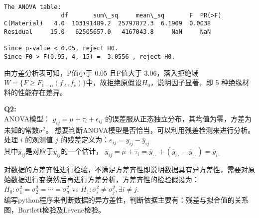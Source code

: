 \documentclass[11pt]{ctexart}
\begin{document}
    \begin{Verbatim}[commandchars=\\\{\}]
The ANOVA table:
                df       sum\_sq     mean\_sq       F  PR(>F)
C(Material)   4.0  103191489.2  25797872.3  6.1909  0.0038
Residual     15.0   62505657.0   4167043.8     NaN     NaN

Since p-value < 0.05, reject H0.
Since F0 > F(0.95, 4, 15) =  3.0556 , reject H0.
    \end{Verbatim}

    由方差分析表可知，P值小于 0.05 且F值大于
3.06，落入拒绝域\(W=\{F\ge F_{1-\alpha}(f_A,f_e)\}\)中，故拒绝原假设\(H_0\)，说明因子显著，即
5 种绝缘材料的性能存在差异。

    \textbf{Q2:}\\
ANOVA模型： \(y_{ij} = \mu + \tau_i + \epsilon_{ij}\)
的误差服从正态独立分布，其均值为零，方差为未知的常数\(\sigma^2\)。
想要判断ANOVA模型是否恰当，可以利用残差检测来进行分析。\\
处理 \(i\) 的观测值 \(j\)
的残差定义为：\(e_{ij} = y_{ij} - \hat{y}_{ij}\)\\
其中\(\hat{y}_{ij}\)是对应于\(y_{ij}\)的一个估计，
\(\hat{y}_{ij} = \hat{\mu} + \hat{\tau}_i = \overline{y}_{··} + (\overline{y}_{i·} - \overline{y}_{··}) = \overline{y}_{i·}\)

    对数据的方差齐性进行检验，不满足方差齐性即说明数据具有异方差性，需要对原始数据进行变换然后再进行方差分析，方差齐性的检验假设为：\(H_0:\sigma_1^2 = \sigma_2^2 = ⋯ = \sigma_a^2\)
vs \(H_1:\sigma_i^2 \neq \sigma_j^2, ∃ i \neq j.\)\\
编写python程序来判断数据的异方差性，判断依据主要有：残差与拟合值的关系图，Bartlett检验及Levene检验。
\end{document}
